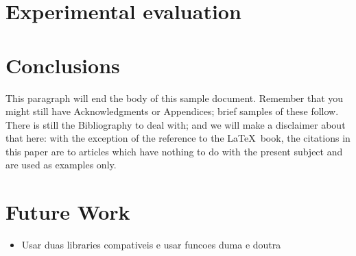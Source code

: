 \documentclass{sig-alternate-05-2015}
\begin{document}
\section{Experimental evaluation}

\section{Conclusions}
This paragraph will end the body of this sample document.
Remember that you might still have Acknowledgments or
Appendices; brief samples of these
follow.  There is still the Bibliography to deal with; and
we will make a disclaimer about that here: with the exception
of the reference to the \LaTeX\ book, the citations in
this paper are to articles which have nothing to
do with the present subject and are used as
examples only.


\section{Future Work}

\begin{itemize}
\item Usar duas libraries compativeis e usar funcoes duma e doutra
\end{itemize}
\end{document}
